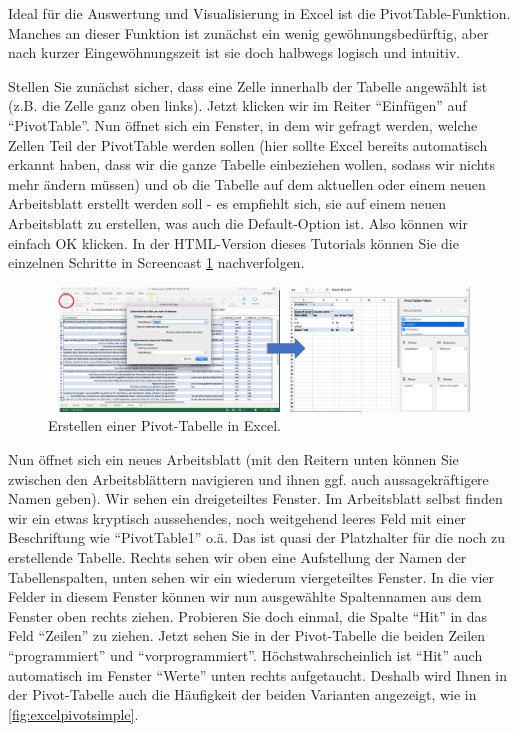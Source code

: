 \documentclass[]{article}
\begin{document}
Ideal für die Auswertung und Visualisierung in Excel ist die
PivotTable-Funktion. Manches an dieser Funktion ist zunächst ein wenig
gewöhnungsbedürftig, aber nach kurzer Eingewöhnungszeit ist sie doch
halbwegs logisch und intuitiv.

Stellen Sie zunächst sicher, dass eine Zelle innerhalb der Tabelle
angewählt ist (z.B. die Zelle ganz oben links). Jetzt klicken wir im
Reiter ``Einfügen'' auf ``PivotTable''. Nun öffnet sich ein Fenster, in
dem wir gefragt werden, welche Zellen Teil der PivotTable werden sollen
(hier sollte Excel bereits automatisch erkannt haben, dass wir die ganze
Tabelle einbeziehen wollen, sodass wir nichts mehr ändern müssen) und ob
die Tabelle auf dem aktuellen oder einem neuen Arbeitsblatt erstellt
werden soll - es empfiehlt sich, sie auf einem neuen Arbeitsblatt zu
erstellen, was auch die Default-Option ist. Also können wir einfach OK
klicken. In der HTML-Version dieses Tutorials können Sie die einzelnen
Schritte in Screencast \ref{fig:excelpivot} nachverfolgen.

\begin{figure}
\includegraphics[width=6.66in]{fig/excelpivot} \caption{Erstellen einer Pivot-Tabelle in Excel.}\label{fig:excelpivot}
\end{figure}

Nun öffnet sich ein neues Arbeitsblatt (mit den Reitern unten können Sie
zwischen den Arbeitsblättern navigieren und ihnen ggf. auch
aussagekräftigere Namen geben). Wir sehen ein dreigeteiltes Fenster. Im
Arbeitsblatt selbst finden wir ein etwas kryptisch aussehendes, noch
weitgehend leeres Feld mit einer Beschriftung wie ``PivotTable1'' o.ä.
Das ist quasi der Platzhalter für die noch zu erstellende Tabelle.
Rechts sehen wir oben eine Aufstellung der Namen der Tabellenspalten,
unten sehen wir ein wiederum viergeteiltes Fenster. In die vier Felder
in diesem Fenster können wir nun ausgewählte Spaltennamen aus dem
Fenster oben rechts ziehen. Probieren Sie doch einmal, die Spalte
``Hit'' in das Feld ``Zeilen'' zu ziehen. Jetzt sehen Sie in der
Pivot-Tabelle die beiden Zeilen ``programmiert'' und
``vorprogrammiert''. Höchstwahrscheinlich ist ``Hit'' auch automatisch
im Fenster ``Werte'' unten rechts aufgetaucht. Deshalb wird Ihnen in der
Pivot-Tabelle auch die Häufigkeit der beiden Varianten angezeigt, wie in
\ref{fig:excelpivotsimple}.
\end{document}
